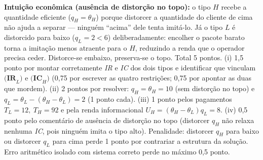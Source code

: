 \begin{solucao}
\textbf{Intuição econômica (ausência de distorção no topo):} o tipo $H$ recebe a quantidade eficiente ($q_H=\theta_H$) porque distorcer a quantidade do cliente de cima não ajuda a separar --- ninguém ``acima'' dele tenta imitá-lo. Já o tipo $L$ é distorcido para baixo ($q_L=2<6$) deliberadamente: encolher o pacote barato torna a imitação menos atraente para o $H$, reduzindo a renda que o operador precisa ceder. Distorce-se embaixo, preserva-se o topo.
\rubricalabel
Total 5 pontos. (i) 1{,}5 ponto por montar corretamente \emph{IR} e \emph{IC} dos dois tipos e identificar que vinculam $\textbf{(IR}_L\textbf{)}$ e $\textbf{(IC}_H\textbf{)}$ (0{,}75 por escrever as quatro restrições; 0{,}75 por apontar as duas que mordem). (ii) 2 pontos por resolver: $q_H=\theta_H=10$ (sem distorção no topo) e $q_L=\theta_L-(\theta_H-\theta_L)=2$ (1 ponto cada). (iii) 1 ponto pelos pagamentos $T_L=12,\ T_H=92$ e pela renda informacional $U_H=(\theta_H-\theta_L)q_L=8$. (iv) 0{,}5 ponto pelo comentário de ausência de distorção no topo (distorcer $q_H$ não relaxa nenhuma \emph{IC}, pois ninguém imita o tipo alto). Penalidade: distorcer $q_H$ para baixo ou distorcer $q_L$ para cima perde 1 ponto por contrariar a estrutura da solução. Erro aritmético isolado com sistema correto perde no máximo 0{,}5 ponto.
\end{solucao}

